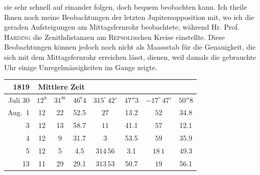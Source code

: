 sie sehr schnell auf einander folgen, doch bequem beobachten kann. Ich theile Ihnen noch meine Beobachtungen der letzten Jupitersopposition mit, wo ich die geraden Aufsteigungen am Mittagsfernrohr
beobachtete, während Hr. Prof. \textsc{Harding} die Zenithdistanzen am \textsc{Repsold}schen Kreise einstellte. Diese
Beobachtungen können jedoch noch nicht als Maassstab für die Genauigkeit, die sich mit dem Mittagsfernrohr erreichen lässt, dienen, weil damals die gebrauchte Uhr einige Unregelmässigkeiten im Gange
zeigte.

\begin{center}
\begin{tabular}{r|ccc|cc|cc}
1819 & \multicolumn{3}{c|}{Mittlere Zeit} & \multicolumn{2}{c|}{} & \multicolumn{2}{c}{} \\
\hline
Juli 30 & $12^{\mathrm{u}}$ & $31^{\mathrm{m}}$ & $46^{\mathrm{s}}4$ & $315^{\circ}\,42'$ & $47''3$ & $-17^{\circ}\,47'$ & $50''8$ \\
Aug.\ 1 & 12 & 22 & 52.5 & $27$ & 13.2 & $52$ & 34.8 \\
3 & 12 & 13 & 58.7 & $11$ & 41.1 & $57$ & 12.1 \\
4 & 12 & 9 & 31.7 & $3$ & 53.5 & $59$ & 35.9 \\
5 & 12 & 5 & 4.5 & $314\,56$ & 3.1 & $18\,1$ & 49.3 \\
13 & 11 & 29 & 29.1 & $313\,53$ & 50.7 & $19$ & 56.1 \\
\end{tabular}
\end{center}

